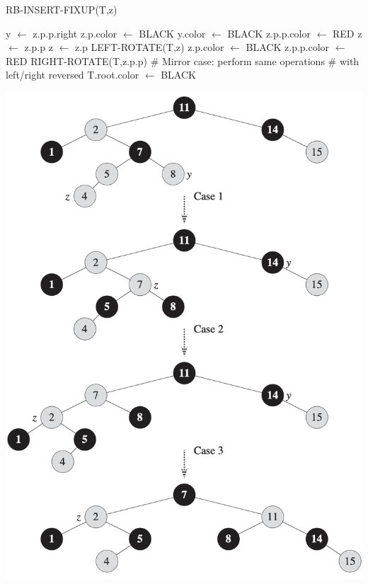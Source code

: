 \begin{minipage}[H]{0.55\textwidth}
    \begin{algorithm}[H]
        \caption{RB-INSERT-FIXUP(T,z)}
        \begin{algorithmic}[1]
                    \State y $\gets$ z.p.p.right
                        \State z.p.color $\gets$ BLACK
                        \State y.color $\gets$ BLACK
                        \State z.p.p.color $\gets$ RED
                        \State z $\gets$ z.p.p
                    \Else
                            \State z $\gets$ z.p
                            \State LEFT-ROTATE(T,z)
                        \EndIf
                        \State z.p.color $\gets$ BLACK
                        \State z.p.p.color $\gets$ RED
                        \State RIGHT-ROTATE(T,z.p.p)
                    \EndIf
                \Else
                    \State \# Mirror case: perform same operations
                    \State \# with left/right reversed
                \EndIf
            \EndWhile
            \State T.root.color $\gets$ BLACK
        \end{algorithmic}
    \end{algorithm}
\end{minipage}%
\begin{minipage}[H]{0.45\textwidth}
    \centering
    \includegraphics[width=\textwidth]{assets/insertion_rbt.png}
\end{minipage}

